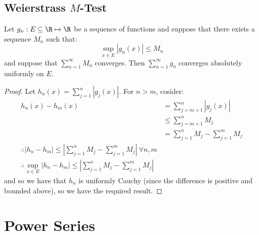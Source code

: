 \documentclass[../Main.tex]{subfiles}
\begin{document}
\subsection{Weierstrass \texorpdfstring{$M$}{M}-Test}
\begin{theorem}
    Let $g_n : E \subseteq \R \mapsto \R$ be a sequence of functions and suppose that there exists a sequence $M_n$ such that:
    \begin{equation*}
        \sup_{x \in E} |g_n(x)| \leq M_n
    \end{equation*}
    and suppose that $\sum_{n = 1}^\infty M_n$ converges. Then $\sum_{n = 1}^\infty g_n$ converges absolutely uniformly on $E$.
    \label{thmWstrassMTest}
\end{theorem}
\begin{proof}
    Let $h_n(x) = \sum_{j = 1}^n |g_j(x)|$. For $n > m$, cosider:
    \begin{align*}
        h_n(x) - h_m(x) &= \sum_{j = m+1}^n |g_j(x)| \\
        &\leq \sum_{j=m+1}^{n}M_j \\
        &= \sum_{j=1}^{n} M_j - \sum_{j=1}^{m} M_j \\
        \therefore |h_n - h_m| \leq \left|\sum_{j=1}^{n} M_j - \sum_{j=1}^{m} M_j\right|~\forall n, m \\
        \therefore \sup_{x \in E}|h_n - h_m| \leq \left|\sum_{j=1}^{n} M_j - \sum_{j=1}^{m} M_j\right|
    \end{align*}
    and so we have that $h_n$ is uniformly Cauchy (since the difference is positive and bounded above), so we have the required result.
\end{proof}
\section{Power Series}
\end{document}
